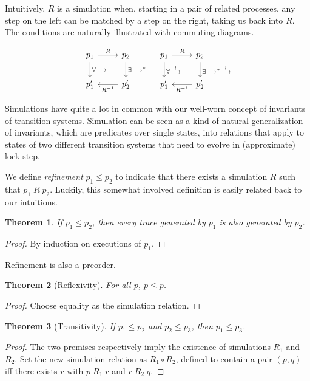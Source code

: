 \documentclass{amsbook}
\newtheorem{theorem}{Theorem}[chapter]
\theoremstyle{definition}
\theoremstyle{remark}
\numberwithin{section}{chapter}
\numberwithin{equation}{chapter}
\begin{document}
Intuitively, $R$ is a simulation when, starting in a pair of related processes, any step on the left can be matched by a step on the right, taking us back into $R$.
The conditions are naturally illustrated with commuting diagrams.

\[
\begin{tikzcd}
p_1 \arrow{r}{R} \arrow{d}{\forall \longrightarrow} & p_2 \arrow{d}{\exists \longrightarrow^*} \\
p'_1 & p'_2 \arrow{l}{R^{-1}}
\end{tikzcd}
\quad \begin{tikzcd}
p_1 \arrow{r}{R} \arrow{d}{\forall \stackrel{l}{\longrightarrow}} & p_2 \arrow{d}{\exists \longrightarrow^* \stackrel{l}{\longrightarrow}} \\
p'_1 & p'_2 \arrow{l}{R^{-1}}
\end{tikzcd}
\]

\newcommand{\refines}[2]{#1 \leq #2}

\invariants
Simulations have quite a lot in common with our well-worn concept of invariants of transition systems.
Simulation can be seen as a kind of natural generalization of invariants, which are predicates over single states, into relations that apply to states of two different transition systems that need to evolve in (approximate) lock-step.

We define \emph{refinement} $\refines{p_1}{p_2}$ to indicate that there exists a simulation $R$ such that $p_1 \; R \; p_2$.
Luckily, this somewhat involved definition is easily related back to our intuitions.

\begin{theorem}
  If $\refines{p_1}{p_2}$, then every trace generated by $p_1$ is also generated by $p_2$.
\end{theorem}
\begin{proof}
  By induction on executions of $p_1$.
\end{proof}

Refinement is also a preorder.

\begin{theorem}[Reflexivity]
  For all $p$, $\refines{p}{p}$.
\end{theorem}
\begin{proof}
  Choose equality as the simulation relation.
\end{proof}

\begin{theorem}[Transitivity]
  If $\refines{p_1}{p_2}$ and $\refines{p_2}{p_3}$, then $\refines{p_1}{p_3}$.
\end{theorem}
\begin{proof}
  The two premises respectively imply the existence of simulations $R_1$ and $R_2$.
  Set the new simulation relation as $R_1 \circ R_2$, defined to contain a pair $(p, q)$ iff there exists $r$ with $p \; R_1 \; r$ and $r \; R_2 \; q$.
\end{proof}
\end{document}
